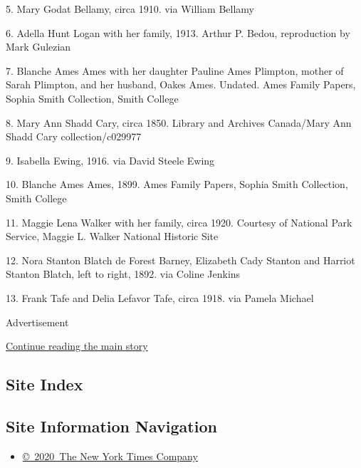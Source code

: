 5. Mary Godat Bellamy, circa 1910. via William Bellamy

6. Adella Hunt Logan with her family, 1913. Arthur P. Bedou,
reproduction by Mark Gulezian

7. Blanche Ames Ames with her daughter Pauline Ames Plimpton, mother of
Sarah Plimpton, and her husband, Oakes Ames. Undated. Ames Family
Papers, Sophia Smith Collection, Smith College

8. Mary Ann Shadd Cary, circa 1850. Library and Archives Canada/Mary Ann
Shadd Cary collection/c029977

9. Isabella Ewing, 1916. via David Steele Ewing

10. Blanche Ames Ames, 1899. Ames Family Papers, Sophia Smith
Collection, Smith College

11. Maggie Lena Walker with her family, circa 1920. Courtesy of National
Park Service, Maggie L. Walker National Historic Site

12. Nora Stanton Blatch de Forest Barney, Elizabeth Cady Stanton and
Harriot Stanton Blatch, left to right, 1892. via Coline Jenkins

13. Frank Tafe and Delia Lefavor Tafe, circa 1918. via Pamela Michael

Advertisement

\protect\hyperlink{after-bottom}{Continue reading the main story}

\hypertarget{site-index}{%
\subsection{Site Index}\label{site-index}}

\hypertarget{site-information-navigation}{%
\subsection{Site Information
Navigation}\label{site-information-navigation}}

\begin{itemize}
\tightlist
\item
  \href{https://help.nytimes.com/hc/en-us/articles/115014792127-Copyright-notice}{©~2020~The
  New York Times Company}
\end{itemize}


